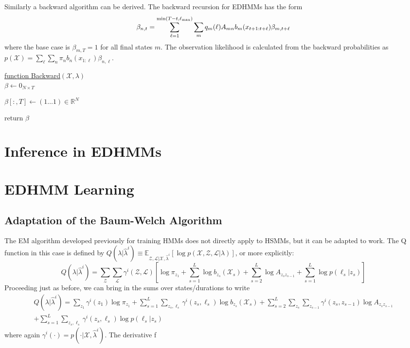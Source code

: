 \documentclass[onecolumn]{gwclass}
\newcommand{\R}{\mathbb{R}}
\begin{document}
	Similarly a backward algorithm can be derived. The backward recursion for EDHMMs has the form
	$$ \beta_{n,t} = \sum_{\ell=1}^{\min(T-t,\ell_{\text{\normalfont{max}}})} \sum_m q_m(\ell)A_{mn} b_m(x_{t+1:t+\ell})\beta_{m,t+\ell} $$
	where the base case is $\beta_{m,T} = 1$ for all final states $m$. The observation likelihood is calculated from the backward probabilities as $ p(\mathcal{X}) = \sum_{\ell}\sum_n\pi_n b_n(x_{1:\ell})\beta_{n,\ell} $. 
	
	\begin{algorithm}
	\caption{EDHMM Backward Algorithm --- Vectors}
	
	\underline{function Backward}$(\mathcal{X},\lambda)$\\
	$\beta \leftarrow 0_{N\times T}$
	
	$\beta[:,T] \leftarrow (1\dots 1) \in \R^N $
	
	
	return $\beta$
	\end{algorithm}

	\section{Inference in EDHMMs}
		
	\section{EDHMM Learning}
	\subsection{Adaptation of the Baum-Welch Algorithm}
	The EM algorithm developed previously for training HMMs does not directly apply to HSMMs, but it can be adapted to work. The Q function in this case is defined by $Q(\lambda|\hat\lambda^i)\equiv \mathbb{E}_{\mathcal{Z},\mathcal{L}|\mathcal{X},\hat\lambda^i}[\log p(\mathcal{X},\mathcal{Z},\mathcal{L}|\lambda)]$, or more explicitly:
	$$ Q(\lambda|\hat\lambda^i) = \sum_{\mathcal{Z}}\sum_\mathcal{L}\gamma^i(\mathcal{Z},\mathcal{L})\left[\log\pi_{z_1} + \sum_{s=1}^L\log b_{z_s}(\mathcal{X}_s) + \sum_{s=2}^L \log A_{z_sz_{s-1}} + \sum_{s=1}^L\log p(\ell_s|z_s)\right] $$
	Proceeding just as before, we can bring in the sums over states/durations to write
	\begin{multline*} 
		Q(\lambda|\hat\lambda^i) = \sum_{z_1}\gamma^i(z_1)\log\pi_{z_1} +  \sum_{s=1}^L\sum_{z_s,\ell_s}\gamma^i(z_s,\ell_s)\log b_{z_s}(\mathcal{X}_s)  + \sum_{s=2}^L\sum_{z_s}\sum_{z_{s-1}}\gamma^i(z_s,z_{s-1}) \log A_{z_sz_{s-1}} \\+ \sum_{s=1}^L\sum_{z_s,\ell_s}\gamma^i(z_s,\ell_s)\log p(\ell_s|z_s)
	\end{multline*}
	where again $\gamma^i(\cdot) = p(\cdot|\mathcal{X},\hat\lambda^i)$. The derivative f
	
\end{document}
